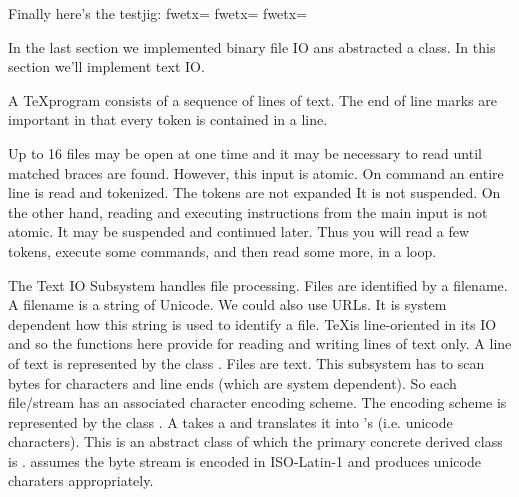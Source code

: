 Finally here's the testjig:
\fwbeginmacro
{}\fwequals \fwodef {}fwetx=%
\fwbtx[

]fwetx=%
\fwoparen \fwoquote{}\fwcquote\fwcomma \fwoquote{}\fwcquote\fwcparen \fwbtx[
]fwetx=%
\fwcdef 
\fwbeginmacronotes
{}
\fwendmacronotes
\fwendmacro
















In the last section we implemented binary file IO ans abstracted a
 class. In this section we'll implement text IO.

A \TeX program consists of a sequence of lines of text. The end of
line marks are important in that every token is contained in a line.

Up to 16 files may be open at one time and it may be necessary to read
until matched braces are found. However, this input is atomic.  On
command an entire line is read and tokenized. The tokens are not
expanded It is not suspended. On the other hand, reading and executing
instructions from the main input is not atomic. It may be suspended
and continued later. Thus you will read a few tokens, execute some
commands, and then read some more, in a loop.

The Text IO Subsystem handles file processing. Files are identified by
a filename. A filename is a string of Unicode. We could also use URLs.
It is system dependent how this string is used to identify a file.
\TeX is line-oriented in its IO and so the functions here provide for
reading and writing lines of text only. A line of text is represented
by the class . Files are text. This subsystem has to
scan bytes for characters and line ends (which are system
dependent). So each file/stream has an associated character encoding
scheme. The encoding scheme is represented by the class
. A  takes a  and translates
it into 's (i.e. unicode characters). This is an abstract
class of which the primary concrete derived class is
.  assumes the byte stream is encoded in
ISO-Latin-1 and produces unicode charaters appropriately.

